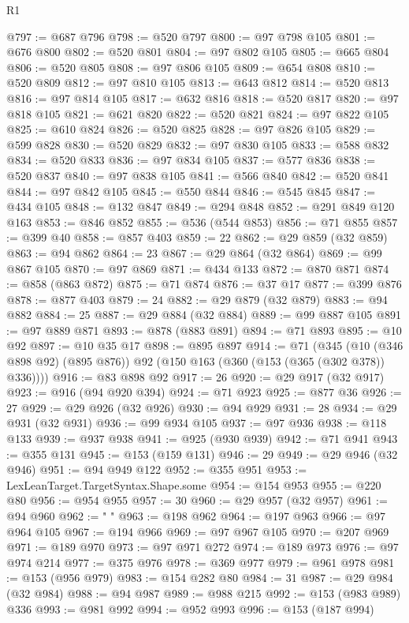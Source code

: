\begin{lexlean}{R1}
\begin{coremodule}
{{{{{{{{{{{{{{{{{{{{{{{{{{{{{{{{{{{{{{{{{{{{{{{{{{{{{{{{{{{{{{{{{{{{{{{{{{{{{{{{{{{{{{{{{{{{{{{{{{{{{{{{{{{{{{{{{{{{{{{{{{{{{{{{{{{{{{{{{{{{{{{{{{{{{{{{{{{{{{{{{{{{{{{{{{{{{{{{{{{{{{{{{{@797 := @687 @796
@798 := @520 @797
@800 := @97 @798 @105
@801 := @676 @800
@802 := @520 @801
@804 := @97 @802 @105
@805 := @665 @804
@806 := @520 @805
@808 := @97 @806 @105
@809 := @654 @808
@810 := @520 @809
@812 := @97 @810 @105
@813 := @643 @812
@814 := @520 @813
@816 := @97 @814 @105
@817 := @632 @816
@818 := @520 @817
@820 := @97 @818 @105
@821 := @621 @820
@822 := @520 @821
@824 := @97 @822 @105
@825 := @610 @824
@826 := @520 @825
@828 := @97 @826 @105
@829 := @599 @828
@830 := @520 @829
@832 := @97 @830 @105
@833 := @588 @832
@834 := @520 @833
@836 := @97 @834 @105
@837 := @577 @836
@838 := @520 @837
@840 := @97 @838 @105
@841 := @566 @840
@842 := @520 @841
@844 := @97 @842 @105
@845 := @550 @844
@846 := @545 @845
@847 := @434 @105
@848 := @132 @847
@849 := @294 @848
@852 := @291 @849 @120 @163
@853 := @846 @852
@855 := @536 (@544 @853)
@856 := @71 @855
@857 := @399 @40
@858 := @857 @403
@859 := 22
@862 := @29 @859 (@32 @859)
@863 := @94 @862
@864 := 23
@867 := @29 @864 (@32 @864)
@869 := @99 @867 @105
@870 := @97 @869
@871 := @434 @133
@872 := @870 @871
@874 := @858 (@863 @872)
@875 := @71 @874
@876 := @37 @17
@877 := @399 @876
@878 := @877 @403
@879 := 24
@882 := @29 @879 (@32 @879)
@883 := @94 @882
@884 := 25
@887 := @29 @884 (@32 @884)
@889 := @99 @887 @105
@891 := @97 @889 @871
@893 := @878 (@883 @891)
@894 := @71 @893
@895 := @10 @92
@897 := @10 @35 @17
@898 := @895 @897
@914 := @71
    (@345 (@10 (@346 @898 @92) (@895 @876)) @92 (@150 @163 (@360 (@153 (@365 (@302 @378)) @336))))
@916 := @83 @898 @92
@917 := 26
@920 := @29 @917 (@32 @917)
@923 := @916 (@94 @920 @394)
@924 := @71 @923
@925 := @877 @36
@926 := 27
@929 := @29 @926 (@32 @926)
@930 := @94 @929
@931 := 28
@934 := @29 @931 (@32 @931)
@936 := @99 @934 @105
@937 := @97 @936
@938 := @118 @133
@939 := @937 @938
@941 := @925 (@930 @939)
@942 := @71 @941
@943 := @355 @131
@945 := @153 (@159 @131)
@946 := 29
@949 := @29 @946 (@32 @946)
@951 := @94 @949 @122
@952 := @355 @951
@953 := LexLeanTarget.TargetSyntax.Shape.some
@954 := @154 @953
@955 := @220 @80
@956 := @954 @955
@957 := 30
@960 := @29 @957 (@32 @957)
@961 := @94 @960
@962 := " "
@963 := @198 @962
@964 := @197 @963
@966 := @97 @964 @105
@967 := @194 @966
@969 := @97 @967 @105
@970 := @207 @969
@971 := @189 @970
@973 := @97 @971 @272
@974 := @189 @973
@976 := @97 @974 @214
@977 := @375 @976
@978 := @369 @977
@979 := @961 @978
@981 := @153 (@956 @979)
@983 := @154 @282 @80
@984 := 31
@987 := @29 @984 (@32 @984)
@988 := @94 @987
@989 := @988 @215
@992 := @153 (@983 @989) @336
@993 := @981 @992
@994 := @952 @993
@996 := @153 (@187 @994)
}}}}}}}}}}}}}}}}}}}}}}}}}}}}}}}}}}}}}}}}}}}}}}}}}}}}}}}}}}}}}}}}}}}}}}}}}}}}}}}}}}}}}}}}}}}}}}}}}}}}}}}}}}}}}}}}}}}}}}}}}}}}}}}}}}}}}}}}}}}}}}}}}}}}}}}}}}}}}}}}}}}}}}}}}}}}}}}}}}}}}}}}}}
\end{coremodule}
\end{lexlean}
